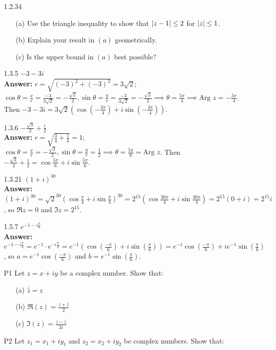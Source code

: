 \documentclass{article}
\begin{document}
\begin{itemize}
    \item [1.2.34]
          \begin{itemize}
              \item [(a)] Use the triangle inequality to show that $\abs{z-1}\leq 2$ for $\abs{z}\leq 1$.
              \item [(b)] Explain your result in $(a)$ geometrically.
              \item [(c)] Is the upper bound in $(a)$ best possible?
          \end{itemize}
    \item [1.3.5] $-3-3i$\\
          \textbf{Answer: } $r=\sqrt{(-3)^2+(-3)^2}=3\sqrt{2}$; $\cos\theta=\frac{x}{r}=\frac{-3}{3\sqrt{2}}=-\frac{\sqrt{2}}{2},\sin\theta=\frac{y}{r}=\frac{-3}{3\sqrt{2}}=-\frac{\sqrt{2}}{2}\implies\theta=\frac{5\pi}{4}\implies\text{Arg }z=-\frac{3\pi}{4}$. Then $-3-3i=3\sqrt{2}(\cos(-\frac{3\pi}{4})+i\sin(-\frac{3\pi}{4}))$.
    \item [1.3.6] $-\frac{\sqrt{3}}{2}+\frac{i}{2}$\\
          \textbf{Answer: } $r=\sqrt{\frac{3}{4}+\frac{1}{4}}=1$; $\cos\theta=\frac{x}{r}=-\frac{\sqrt{3}}{2},\sin\theta=\frac{y}{r}=\frac{1}{2}\implies\theta=\frac{5\pi}{6}=\text{Arg }z$. Then $-\frac{\sqrt{3}}{2}+\frac{i}{2}=\cos\frac{5\pi}{6}+i\sin\frac{5\pi}{6}$.
    \item [1.3.21] $(1+i)^{30}$\\
          \textbf{Answer: } $(1+i)^{30}=\sqrt{2}^{30}(\cos\frac{\pi}{4}+i\sin\frac{\pi}{4})^{30}=2^{15}(\cos\frac{30\pi}{4}+i\sin\frac{30\pi}{4})=2^{15}(0+i)=2^{15}i$, so $\Re z=0$ and $\Im z=2^{15}$.
    \item [1.5.7] $e^{-1-i\frac{\pi}{6}}$\\
          \textbf{Answer: } $e^{-1-i\frac{\pi}{6}}=e^{-1}\cdot e^{-i\frac{\pi}{6}}=e^{-1}(\cos(\frac{-\pi}{6})+i\sin(\frac{\pi}{6}))=e^{-1}\cos(\frac{-\pi}{6})+ie^{-1}\sin(\frac{\pi}{6})$, so $a=e^{-1}\cos(\frac{-\pi}{6})$ and $b=e^{-1}\sin(\frac{\pi}{6})$.
    \item [P1] Let $z=x+iy$ be a complex number. Show that:
    \begin{itemize}
        \item [(a)] $\bar{\bar{z}}=z$
        \item [(b)] $\Re(z)=\frac{z+\bar{z}}{2}$
        \item [(c)] $\Im(z)=\frac{z-\bar{z}}{2i}$
    \end{itemize}
    \item [P2] Let $z_1=x_1+iy_1$ and $z_2=x_2+iy_2$ be complex numbers. Show that:

\end{itemize}
\end{document}
